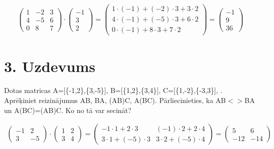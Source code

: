 \documentclass{article}
\begin{document}
\begin{gather*}
    \begin{pmatrix}
        1 & -2 & 3\\
        4 & -5 & 6\\
        0 & 8 & 7
    \end{pmatrix}
    \cdot
    \begin{pmatrix}
        -1\\
        3\\
        2
    \end{pmatrix}
    =
    \begin{pmatrix}
        1 \cdot (-1) + (-2) \cdot 3 + 3 \cdot 2\\
        4 \cdot (-1) + (-5) \cdot 3 + 6 \cdot 2\\
        0 \cdot (-1) + 8 \cdot 3 + 7 \cdot 2
    \end{pmatrix}
    =
    \begin{pmatrix}
        -1\\
        9\\
        36
    \end{pmatrix}
\end{gather*}

\clearpage

\section*{3. Uzdevums}
Dotas matricas A=[\{-1,2\},\{3,-5\}], B=[\{1,2\},\{3,4\}], C=[\{1,-2\},\{-3,3\}], . Aprēķiniet reizinājumus AB, BA, (AB)C, A(BC). Pārliecinieties, ka AB$<>$BA un A(BC)=(AB)C. Ko no tā var secināt?

\begin{gather*}
    \begin{pmatrix}
        -1 & 2\\
        3 & -5
    \end{pmatrix}
    \cdot
    \begin{pmatrix}
        1 & 2\\
        3 & 4
    \end{pmatrix}
    =
    \begin{pmatrix}
        -1 \cdot 1 + 2 \cdot 3 & (-1) \cdot 2 + 2 \cdot 4\\
        3 \cdot 1 + (-5) \cdot 3 & 3 \cdot 2 + (-5) \cdot 4
    \end{pmatrix}
    =
    \begin{pmatrix}
        5 & 6\\
        -12 & -14
    \end{pmatrix}
\end{gather*}
\end{document}
